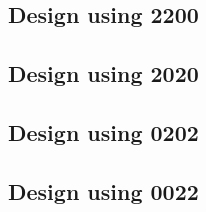 \subsection{Design using 2200}


 \begin{center}




 \end{center}



\subsection{Design using 2020}


 \begin{center}




 \end{center}



\subsection{Design using 0202}


 \begin{center}




 \end{center}



\subsection{Design using 0022}

